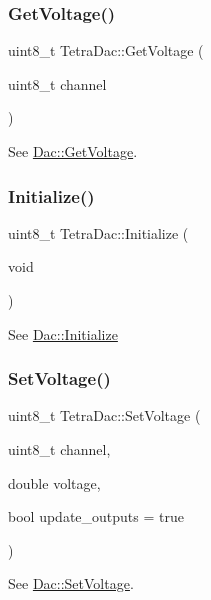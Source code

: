 \subsubsection{\texorpdfstring{Get\+Voltage()}{GetVoltage()}}
{\footnotesize\ttfamily uint8\+\_\+t Tetra\+Dac\+::\+Get\+Voltage (\begin{DoxyParamCaption}\item[{uint8\+\_\+t}]{channel }\end{DoxyParamCaption})}

See \mbox{\hyperlink{classDac_ad51bf5450f03f39a0357398af69f1705}{Dac\+::\+Get\+Voltage}}. \mbox{\label{classTetraDac_a57fd4d8db59603efe74c0c3902c64ae9}} 
\subsubsection{\texorpdfstring{Initialize()}{Initialize()}}
{\footnotesize\ttfamily uint8\+\_\+t Tetra\+Dac\+::\+Initialize (\begin{DoxyParamCaption}\item[{void}]{ }\end{DoxyParamCaption})}

See \mbox{\hyperlink{classDac_aea1f5f36c9371ebc1527e848ce67e47a}{Dac\+::\+Initialize}} \mbox{\label{classTetraDac_a265bed4317bb6b3b4c6962fa538631da}} 
\subsubsection{\texorpdfstring{Set\+Voltage()}{SetVoltage()}}
{\footnotesize\ttfamily uint8\+\_\+t Tetra\+Dac\+::\+Set\+Voltage (\begin{DoxyParamCaption}\item[{uint8\+\_\+t}]{channel,  }\item[{double}]{voltage,  }\item[{bool}]{update\+\_\+outputs = {\ttfamily true} }\end{DoxyParamCaption})}

See \mbox{\hyperlink{classDac_ab2f0e36184b9b529de04136c36a3a51b}{Dac\+::\+Set\+Voltage}}. \mbox{\label{classTetraDac_ae7e2c1afbc64a8cc0ddd2ef4af0b25b3}} 
